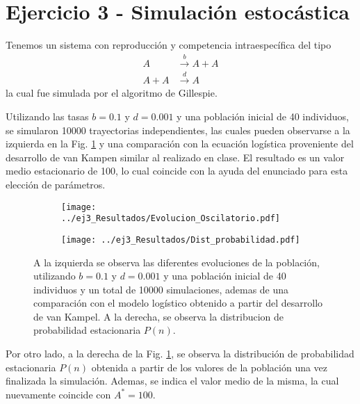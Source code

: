 \clearpage
\section*{Ejercicio 3 - Simulación estocástica}

Tenemos un sistema con reproducción y competencia intraespecífica del tipo
\begin{align}
    A       &\overset{b}{\rightarrow} A + A \\ 
    A + A   &\overset{d}{\rightarrow} A
\end{align}
la cual fue simulada por el algoritmo de Gillespie.

Utilizando las tasas $b=0.1$ y $d=0.001$ y una población inicial de 40 individuos, se simularon 10000 trayectorias independientes, las cuales pueden observarse a la izquierda en la Fig. \ref{ej3:Resultados} y una comparación con la ecuación logística proveniente del desarrollo de van Kampen similar al realizado en clase. El resultado es un valor medio estacionario de 100, lo cual coincide con la ayuda del enunciado para esta elección de parámetros.

\begin{figure}[htb!]
    \centering
    \begin{subfigure}[b]{0.49\textwidth}
        \texttt{[image: ../ej3\_Resultados/Evolucion\_Oscilatorio.pdf]}
    \end{subfigure}
    \begin{subfigure}[b]{0.49\textwidth}
        \texttt{[image: ../ej3\_Resultados/Dist\_probabilidad.pdf]}
    \end{subfigure}
    \caption{A la izquierda se observa las diferentes evoluciones de la población, utilizando $b=0.1$ y $d=0.001$ y una población inicial de 40 individuos y un total de 10000 simulaciones, ademas de una comparación con el modelo logístico obtenido a partir del desarrollo de van Kampel. A la derecha, se observa la distribucion de probabilidad estacionaria $P\left(n\right)$.}
    \label{ej3:Resultados}
\end{figure}

Por otro lado, a la derecha de la Fig. \ref{ej3:Resultados}, se observa la distribución de probabilidad estacionaria $P\left(n\right)$ obtenida a partir de los valores de la población una vez finalizada la simulación. Ademas, se indica el valor medio de la misma, la cual nuevamente coincide con $A^* = 100$.


